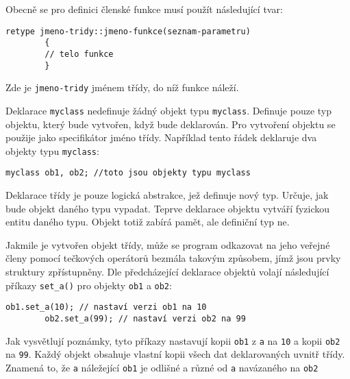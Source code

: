       Obecně se pro definici členské funkce musí použít následující tvar:
      \begin{lstlisting}[style=luaCPPStyle]
        retype jmeno-tridy::jmeno-funkce(seznam-parametru)
        {
        // telo funkce
        }
      \end{lstlisting}
      Zde je \texttt{jmeno-tridy} jménem třídy, do níž funkce  náleží.

      Deklarace \lstinline[style=luaCPPText]!myclass! nedefinuje žádný objekt typu
      \lstinline[style=luaCPPText]!myclass!. Definuje pouze typ objektu, který bude vytvořen, když
      bude deklarován. Pro vytvoření objektu se použije jako specifikátor jméno třídy. Například
      tento řádek deklaruje dva objekty typu \lstinline[style=luaCPPText]!myclass!:
      \begin{lstlisting}[style=luaCPPStyle]
        myclass ob1, ob2; //toto jsou objekty typu myclass
      \end{lstlisting}

      \begin{mdframed}[style=highlight]
        Deklarace třídy je pouze logická abstrakce, jež definuje nový typ. Určuje, jak bude objekt
        daného typu vypadat. Teprve deklarace objektu vytváří fyzickou entitu daného typu. Objekt
        totiž zabírá pamět, ale definiční typ ne.
      \end{mdframed}

      Jakmile je vytvořen objekt třídy, může se program odkazovat na jeho veřejné členy pomocí
      tečkových operátorů bezmála takovým způsobem, jímž jsou prvky struktury zpřístupněny. Dle
      předcházející deklarace objektů volají následující příkazy
      \lstinline[style=luaCPPText]!set_a()! pro objekty \lstinline[style=luaCPPText]!ob1! a
      \lstinline[style=luaCPPText]!ob2!:
      \begin{lstlisting}[style=luaCPPStyle]
        ob1.set_a(10); // nastaví verzi ob1 na 10
        ob2.set_a(99); // nastaví verzi ob2 na 99
      \end{lstlisting}
      Jak vysvětlují poznámky, tyto příkazy nastavují kopii \lstinline[style=luaCPPText]!ob1! z
      \lstinline[style=luaCPPText]!a! na \lstinline[style=luaCPPText]!10! a kopii
      \lstinline[style=luaCPPText]!ob2! na \lstinline[style=luaCPPText]!99!. Každý objekt obsahuje
      vlastní kopii všech dat deklarovaných uvnitř třídy. Znamená to, že
      \lstinline[style=luaCPPText]!a! náležející \lstinline[style=luaCPPText]!ob1! je odlišné a
      různé od \lstinline[style=luaCPPText]!a! navázaného na \lstinline[style=luaCPPText]!ob2!

